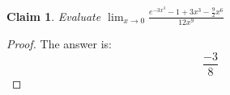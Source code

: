 \documentclass{article}
\newtheorem{theorem}{Claim}
\begin{document}
\begin{theorem}
Evaluate $\lim_{x \to 0} \frac{e^{-3x^3}-1+3x^3-\frac{9}{2}x^6}{12x^9}$
\end{theorem}

\begin{proof}
The answer is:
\[
\frac{-3}{8}
\]
\end{proof}
\end{document}
